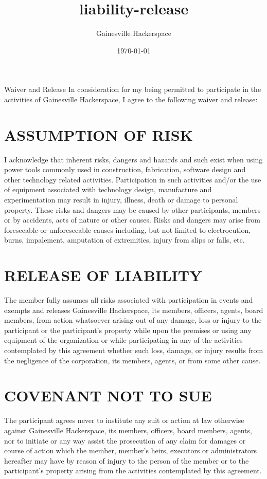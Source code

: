 \documentclass[article,letterpaper,times,12pt,listings-bw,microtype]{article}
\author{Gainesville Hackerspace}
\date{\today}
\title{liability-release}
\begin{document}
\maketitle
Waiver and Release
In consideration for my being permitted to participate in the
activities of Gainesville Hackerspace, I agree to the following
waiver and release:

\section{ASSUMPTION OF RISK}
\label{sec-1}

I acknowledge that inherent risks, dangers and hazards and such exist
when using power tools commonly used in construction, fabrication,
software design and other technology related
activities. Participation in such activities and/or the use of
equipment associated with technology design, manufacture and
experimentation may result in injury, illness, death or damage to
personal property. These risks and dangers may be caused by other
participants, members or by accidents, acts of nature or other
causes. Risks and dangers may arise from foreseeable or unforeseeable
causes including, but not limited to electrocution, burns,
impalement, amputation of extremities, injury from slips or falls,
etc.

\section{RELEASE OF LIABILITY}
\label{sec-2}

The member fully assumes all risks associated with participation in
events and exempts and releases Gainesville Hackerspace, its members,
officers, agents, board members, from action whatsoever arising out
of any damage, loss or injury to the participant or the participant’s
property while upon the premises or using any equipment of the
organization or while participating in any of the activities
contemplated by this agreement whether such loss, damage, or injury
results from the negligence of the corporation, its members, agents,
or from some other cause.

\section{COVENANT NOT TO SUE}
\label{sec-3}

The participant agrees never to institute any suit or action at law
otherwise against Gainesville Hackerspace, its members, officers,
board members, agents, nor to initiate or any way assist the
prosecution of any claim for damages or course of action which the
member, member’s heirs, executors or administrators hereafter may
have by reason of injury to the person of the member or to the
participant’s property arising from the activities contemplated by
this agreement.
\end{document}

